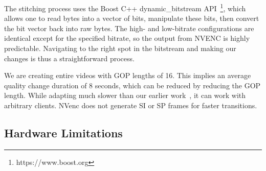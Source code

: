 The stitching process uses the Boost C++ dynamic\_bitstream API~\footnote{https://www.boost.org}, which allows one to read bytes into a vector of bits, manipulate these bits, then convert the bit vector back into raw bytes. The high- and low-bitrate configurations are identical except for the specified bitrate, so the output from NVENC is highly predictable. Navigating to the right spot in the bitstream and making our changes is thus a straightforward process.


We are creating  entire videos with GOP lengths of 16. This implies an average quality change duration of 8 seconds, which can be reduced by reducing the GOP length. While adapting much slower than our earlier work~\cite{ism-2018}, it can work with arbitrary clients. NVenc does not generate SI or SP frames for faster transitions.

\subsection{Hardware Limitations}

